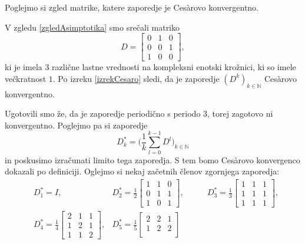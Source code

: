 \documentclass[mat1]{fmfdelo}
\newcommand{\N}{\mathbb N}
\begin{document}
Poglejmo si zgled matrike, katere zaporedje je Ces\`arovo konvergentno.
\begin{zgled}
    V zgledu \ref{zgledAsimptotika} smo srečali matriko
    \begin{equation*}
        D =
        \begin{bmatrix}
            0 & 1 & 0 \\
            0 & 0 & 1 \\
            1 & 0 & 0
        \end{bmatrix},
    \end{equation*}
    ki je imela $3$ različne lastne vrednosti na kompleksni enotski krožnici, ki so imele večkratnost $1$. Po izreku \ref{izrekCesaro} sledi, da je zaporedje $(D^k)_{k\in\N}$ Ces\`arovo konvergentno.
    
    Ugotovili smo že, da je zaporedje periodično s periodo 3, torej zagotovo ni konvergentno. Poglejmo pa si zaporedje
    \begin{equation*}
        D_k^\ast = \Big(\frac{1}{k} \sum_{l=0}^{k-1} D^l\Big)_{k\in\N}
    \end{equation*}
    in poskusimo izračunati limito tega zaporedja. S tem bomo Ces\`arovo konvergenco dokazali po definiciji. Oglejmo si nekaj začetnih členov zgornjega zaporedja:
    \begin{align*}
        &D_1^\ast = I,
        &D_2^\ast = \frac{1}{2}
        \begin{bmatrix}
            1 & 1 & 0 \\
            0 & 1 & 1 \\
            1 & 0 & 1
        \end{bmatrix},\quad\quad
        &D_3^\ast = \frac{1}{3}
        \begin{bmatrix}
            1 & 1 & 1 \\
            1 & 1 & 1 \\
            1 & 1 & 1
        \end{bmatrix},\\
        &D_4^\ast = \frac{1}{4}
        \begin{bmatrix}
            2 & 1 & 1 \\
            1 & 2 & 1 \\
            1 & 1 & 2
        \end{bmatrix},
        &D_5^\ast = \frac{1}{5}
        \begin{bmatrix}
            2 & 2 & 1 \\
            1 & 2 & 2 \\

\end{bmatrix}
\end{align*}
\end{zgled}
\end{document}
